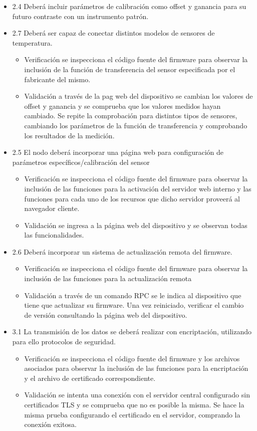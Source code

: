 \documentclass[11pt]{charter}
\begin{document}
\begin{itemize}
\item 2.4 Deberá incluir parámetros de calibración como offset y ganancia para su futuro contraste con un instrumento patrón.
\item 2.7 Deberá ser capaz de conectar distintos modelos de sensores de temperatura.

\begin{itemize}
\item Verificación se inspecciona el código fuente del firmware para observar la inclusión de la función de transferencia del sensor especificada por el fabricante del mismo.
\item Validación a través de la pag web del dispositivo se cambian los valores de offset y ganancia y se comprueba que los valores medidos hayan cambiado. Se repite la comprobación para distintos tipos de sensores, cambiando los parámetros de la función de transferencia y comprobando los resultados de la medición.
\end{itemize}

\item 2.5 El nodo deberá incorporar una página web para configuración de parámetros específicos/calibración del sensor
\begin{itemize}
\item Verificación se inspecciona el código fuente del firmware para observar la inclusión de las funciones para la activación del servidor web interno y las funciones para cada uno de los recursos que dicho servidor proveerá al navegador cliente.
\item Validación se ingresa a la página web del dispositivo y se observan todas las funcionalidades.
\end{itemize}


\item 2.6 Deberá incorporar un sistema de actualización remota del firmware.
\begin{itemize}
\item Verificación se inspecciona el código fuente del firmware para observar la inclusión de las funciones para la actualización remota
\item Validación a través de un comando RPC se le indica al dispositivo que tiene que actualizar su firmware. Una vez reiniciado, verificar el cambio de versión consultando la página web del dispositivo.
\end{itemize}

\item 3.1 La transmisión de los datos se deberá realizar con encriptación, utilizando para ello protocolos de seguridad.
\begin{itemize}
\item Verificación se inspecciona el código fuente del firmware y los archivos asociados para observar la inclusión de las funciones para la encriptación y el archivo de certificado correspondiente.
\item Validación se intenta una conexión con el servidor central configurado sin certificados TLS y se comprueba que no es posible la misma. Se hace la misma prueba configurando el certificado en el servidor, comprando la conexión exitosa.
\end{itemize}


\end{itemize}
\end{document}
